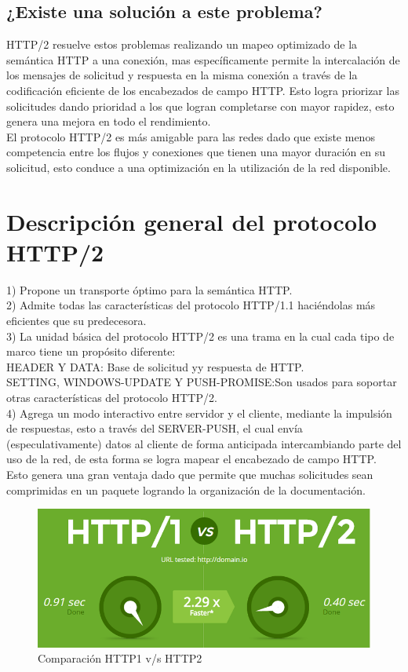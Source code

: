 \documentclass[spanish]{udpreport}
\begin{document}
\section{¿Existe una solución a este problema?}
HTTP/2 resuelve estos problemas realizando un mapeo optimizado de la semántica HTTP  a una conexión, mas específicamente permite la intercalación de los mensajes  de solicitud y respuesta en la misma conexión a través de la codificación eficiente de los encabezados de campo HTTP. Esto logra priorizar las solicitudes dando prioridad a los que logran completarse con mayor rapidez, esto genera una mejora en todo el rendimiento.
\\[0.2cm]
El protocolo HTTP/2 es más amigable para las redes dado que existe menos competencia entre los flujos y conexiones que tienen una mayor duración en su solicitud, esto conduce a una optimización en la utilización de la red disponible.
\chapter{Descripción general del protocolo HTTP/2}
1)	Propone un transporte óptimo para la semántica HTTP.
\\[0.2cm]
2)	Admite todas las características del protocolo HTTP/1.1 haciéndolas más eficientes que su predecesora.
\\[0.2cm]
3)	La unidad básica del protocolo HTTP/2 es una trama en la cual  cada tipo de marco tiene un propósito diferente:
\\[0.2cm]
HEADER Y DATA: Base de solicitud yy respuesta  de HTTP.
\\[0.2cm]
SETTING, WINDOWS-UPDATE Y PUSH-PROMISE:Son usados para soportar otras características del protocolo HTTP/2.
\\[0.2cm]
4)	Agrega un modo interactivo entre servidor y el cliente, mediante la impulsión de respuestas, esto a través del SERVER-PUSH, el cual envía (especulativamente) datos al cliente  de forma anticipada intercambiando parte del uso de la red, de esta forma se logra mapear el encabezado  de campo HTTP.
\\[0.2cm]
Esto genera una gran ventaja dado que permite que muchas solicitudes sean comprimidas en un paquete logrando la organización de la documentación.
\\
\begin{figure}[h]
    \centering
    \includegraphics[scale=0.5]{images/http1-vs-http2.png}
    \caption{Comparación HTTP1 v/s HTTP2}
    \label{fig:my_label}
\end{figure}
\\
\end{document}
